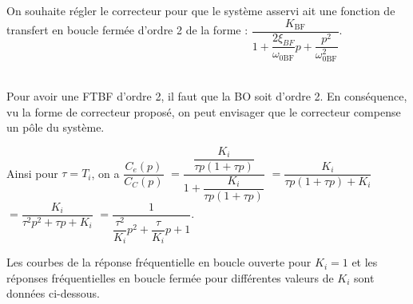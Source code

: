 \ifprof
\else
On souhaite régler le correcteur pour que le système asservi ait une fonction de transfert en boucle fermée
d’ordre 2 de la forme :
$\dfrac{K_{\text{BF}}}{1+\dfrac{2\xi_{BF}}{\omega_{0\text{BF}}}p+\dfrac{p^2}{\omega_{0\text{BF}}^2}}$.
\fi

\ifprof
\begin{corrige} ~\\
Pour avoir une FTBF d'ordre 2, il faut que la BO soit d'ordre 2. En conséquence, vu la forme de correcteur proposé, on peut envisager que le correcteur compense un pôle du système. 

Ainsi pour $\tau=T_i$, on a $\dfrac{C_e(p)}{C_C(p)}$
$=\dfrac{\dfrac{K_i}{\tau p\left(1+\tau p \right)}}{1+\dfrac{K_i}{\tau p\left(1+\tau p \right)}}$
$=\dfrac{K_i}{\tau p\left(1+\tau p \right)+ K_i}$
$=\dfrac{K_i}{\tau^2 p^2+\tau p+ K_i}$
$=\dfrac{1}{\dfrac{\tau^2}{K_i} p^2+\dfrac{\tau}{K_i} p+ 1}$.
\end{corrige}
\else
\fi


\ifprof
\else
Les courbes de la réponse fréquentielle en boucle ouverte pour
$K_i=1$ et les réponses fréquentielles en boucle fermée pour différentes valeurs de $K_i$ sont données ci-dessous.
\fi

